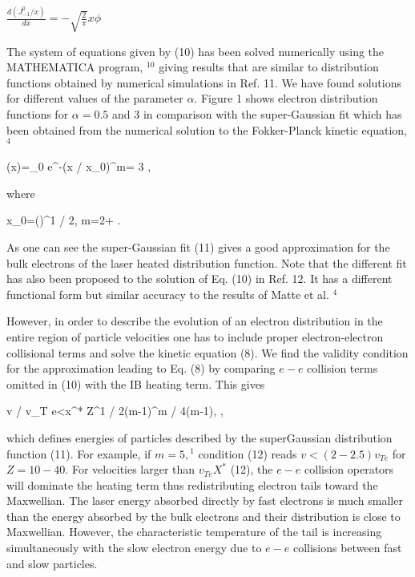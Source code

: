 \documentclass[oneside,onecolumn]{article}
\begin{document}
\begin{sloppypar}
 $\frac{d\left(J_{-1}^{0} / x\right)}{d x}=-\sqrt{\frac{2}{\pi}} x \phi$
 
 The system of equations given by (10) has been solved numerically using the MATHEMATICA program, ${ }^{10}$ giving results that are similar to distribution functions obtained by numerical simulations in Ref. 11. We have found solutions for different values of the parameter $\alpha$. Figure 1 shows electron distribution functions for $\alpha=0.5$ and 3 in comparison with the super-Gaussian fit which has been obtained from the numerical solution to the Fokker-Planck kinetic equation, ${ }^{4}$
 
 \phi(x)=\phi_{0} e^{-\left(x / x_{0}\right)^{m}}=  3  
 \times \exp {},
 
 where
 
 x_{0}=\left(\right)^{1 / 2}, \quad m=2+ .
 
 As one can see the super-Gaussian fit (11) gives a good approximation for the bulk electrons of the laser heated distribution function. Note that the different fit has also been proposed to the solution of Eq. (10) in Ref. 12. It has a different functional form but similar accuracy to the results of Matte et al. ${ }^{4}$
 
 However, in order to describe the evolution of an electron distribution in the entire region of particle velocities one has to include proper electron-electron collisional terms and solve the kinetic equation (8). We find the validity condition for the approximation leading to Eq. (8) by comparing $e-e$ collision terms omitted in (10) with the IB heating term. This gives
 
 v / v_{T e}<x^{*} \equiv Z^{1 / 2(m-1)}^{m / 4(m-1)}, \quad \alpha {},
 
 which defines energies of particles described by the superGaussian distribution function (11). For example, if $m=5,{ }^{1}$ condition (12) reads $v<(2-2.5) v_{T e}$ for $Z=10-40$. For velocities larger than $v_{T e} X^{*}$ (12), the $e-e$ collision operators will dominate the heating term thus redistributing electron tails toward the Maxwellian. The laser energy absorbed directly by fast electrons is much smaller than the energy absorbed by the bulk electrons and their distribution is close to Maxwellian. However, the characteristic temperature of the tail is increasing simultaneously with the slow electron energy due to $e-e$ collisions between fast and slow particles.
 

\end{sloppypar}
\end{document}
